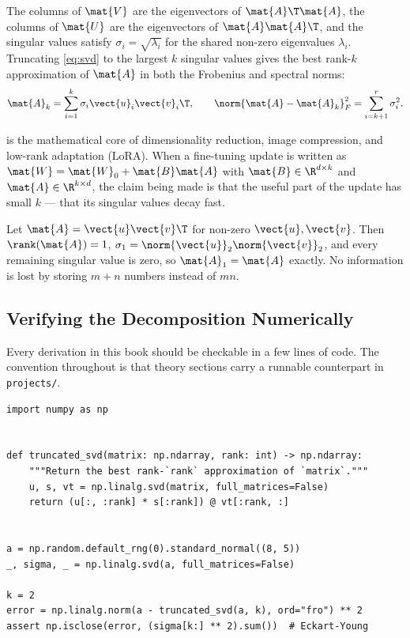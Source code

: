 The columns of $\mat{V}$ are the eigenvectors of $\mat{A}\T\mat{A}$, the columns
of $\mat{U}$ are the eigenvectors of $\mat{A}\mat{A}\T$, and the singular values
satisfy $\sigma_i = \sqrt{\lambda_i}$ for the shared non-zero eigenvalues
$\lambda_i$. Truncating \cref{eq:svd} to the largest $k$ singular values gives
the best rank-$k$ approximation of $\mat{A}$ in both the Frobenius and spectral
norms:
%
\begin{equation}
    \mat{A}_k = \sum_{i=1}^{k} \sigma_i \vect{u}_i \vect{v}_i\T ,
    \qquad
    \norm{\mat{A} - \mat{A}_k}_F^2 = \sum_{i=k+1}^{r} \sigma_i^2 .
    \label{eq:eckart-young}
\end{equation}

\begin{intuition}
     is the mathematical core of dimensionality reduction,
    image compression, and low-rank adaptation (LoRA). When a fine-tuning update
    is written as $\mat{W} = \mat{W}_0 + \mat{B}\mat{A}$ with
    $\mat{B} \in \R^{d \times k}$ and $\mat{A} \in \R^{k \times d}$, the claim
    being made is that the useful part of the update has small $k$ --- that its
    singular values decay fast.
\end{intuition}

\begin{example}
    Let $\mat{A} = \vect{u}\vect{v}\T$ for non-zero $\vect{u}, \vect{v}$. Then
    $\rank(\mat{A}) = 1$, $\sigma_1 = \norm{\vect{u}}_2\norm{\vect{v}}_2$, and
    every remaining singular value is zero, so $\mat{A}_1 = \mat{A}$ exactly.
    No information is lost by storing $m + n$ numbers instead of $mn$.
\end{example}

\subsection{Verifying the Decomposition Numerically}

Every derivation in this book should be checkable in a few lines of code. The
convention throughout is that theory sections carry a runnable counterpart in
\texttt{projects/}.

\begin{lstlisting}[caption={Confirming the Eckart--Young bound from \cref{eq:eckart-young}.},label={lst:svd}]
import numpy as np


def truncated_svd(matrix: np.ndarray, rank: int) -> np.ndarray:
    """Return the best rank-`rank` approximation of `matrix`."""
    u, s, vt = np.linalg.svd(matrix, full_matrices=False)
    return (u[:, :rank] * s[:rank]) @ vt[:rank, :]


a = np.random.default_rng(0).standard_normal((8, 5))
_, sigma, _ = np.linalg.svd(a, full_matrices=False)

k = 2
error = np.linalg.norm(a - truncated_svd(a, k), ord="fro") ** 2
assert np.isclose(error, (sigma[k:] ** 2).sum())  # Eckart-Young
\end{lstlisting}

